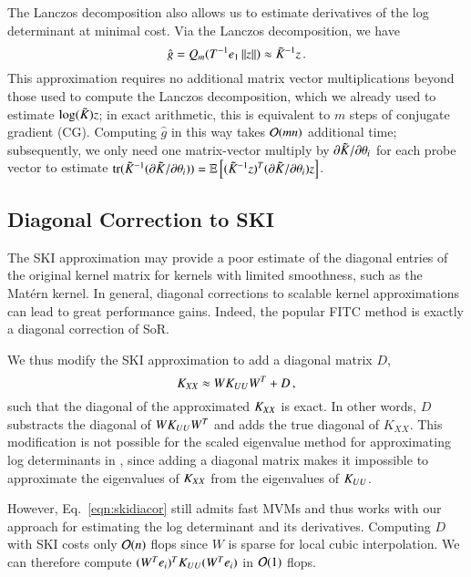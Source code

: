 The Lanczos decomposition also allows us to estimate derivatives of the log
determinant at minimal cost. Via the Lanczos decomposition, we have
\begin{equation}\label{eqn:lansolve}
  \hat{g} = Q_m (T^{-1} e_1 \left\lVert z\right\rVert) \approx \tilde{K}_{}^{-1}z \,.
\end{equation}
This approximation requires no additional matrix vector multiplications beyond
those used to compute the Lanczos decomposition, which we already used to
estimate $\log(\tilde{K}_{}) z$; in exact arithmetic, this is equivalent to $m$ steps
of conjugate gradient (CG). Computing $\hat{g}$ in this way takes $\mathcal{O}(mn)$
additional time; subsequently, we only need one matrix-vector multiply by
$\partial \tilde{K}_{} / \partial \theta_i$ for each probe vector to estimate $\operatorname{tr}
(\tilde{K}_{}^{-1} (\partial \tilde{K}_{} / \partial \theta_i)) = \operatorname{\mathbb{E}}\left[(\tilde{K}_{}^{-1}
z)^T(\partial \tilde{K}_{}/\partial \theta_i) z\right]$.


\subsection{Diagonal Correction to SKI}\label{sgpsec:dia}

The SKI approximation may provide a poor estimate of the diagonal entries of the
original kernel matrix for kernels with limited smoothness, such as the Mat\'ern
kernel. In general, diagonal corrections to scalable kernel approximations can
lead to great performance gains.  Indeed, the popular FITC method 
\citep{snelson2006sparse} is exactly a diagonal correction of SoR.

We thus modify the SKI approximation to add a diagonal matrix $D$,
\begin{equation}\label{eqn:skidiacor}
    K_{XX} \approx W K_{UU} W^T + D\, ,
\end{equation}
such that the diagonal of the approximated $K_{XX}$ is exact. In other words,
$D$ substracts the diagonal of $W K_{UU} W^T$ and adds the true diagonal of $K_
{XX}$.  This modification is not possible for the scaled eigenvalue method for
approximating log determinants in \citep{wilson2015kernel}, since adding a
diagonal matrix makes it impossible to approximate the eigenvalues of $K_{XX}$
from the eigenvalues of $K_{UU}$.

However, Eq.~\ref{eqn:skidiacor} still admits fast MVMs and thus works with our
approach for estimating the log determinant and its derivatives. Computing $D$
with SKI costs only $\mathcal{O}(n)$ flops since $W$ is sparse for local cubic
interpolation. We can therefore compute $(W^Te_i)^TK_{UU}(W^Te_i)$ in $\mathcal{O}(1)$
flops.

